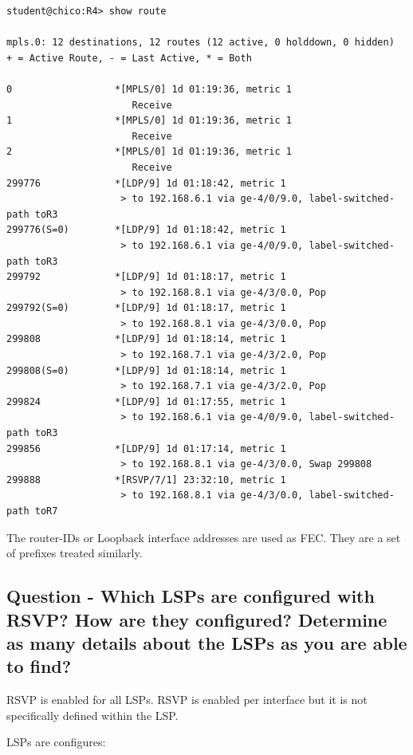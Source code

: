 \documentclass[a4paper]{article}
\begin{document}
\begin{verbatim}
student@chico:R4> show route 

mpls.0: 12 destinations, 12 routes (12 active, 0 holddown, 0 hidden)
+ = Active Route, - = Last Active, * = Both

0                  *[MPLS/0] 1d 01:19:36, metric 1
                      Receive
1                  *[MPLS/0] 1d 01:19:36, metric 1
                      Receive
2                  *[MPLS/0] 1d 01:19:36, metric 1
                      Receive
299776             *[LDP/9] 1d 01:18:42, metric 1
                    > to 192.168.6.1 via ge-4/0/9.0, label-switched-path toR3
299776(S=0)        *[LDP/9] 1d 01:18:42, metric 1
                    > to 192.168.6.1 via ge-4/0/9.0, label-switched-path toR3
299792             *[LDP/9] 1d 01:18:17, metric 1
                    > to 192.168.8.1 via ge-4/3/0.0, Pop      
299792(S=0)        *[LDP/9] 1d 01:18:17, metric 1
                    > to 192.168.8.1 via ge-4/3/0.0, Pop      
299808             *[LDP/9] 1d 01:18:14, metric 1
                    > to 192.168.7.1 via ge-4/3/2.0, Pop      
299808(S=0)        *[LDP/9] 1d 01:18:14, metric 1
                    > to 192.168.7.1 via ge-4/3/2.0, Pop      
299824             *[LDP/9] 1d 01:17:55, metric 1
                    > to 192.168.6.1 via ge-4/0/9.0, label-switched-path toR3
299856             *[LDP/9] 1d 01:17:14, metric 1
                    > to 192.168.8.1 via ge-4/3/0.0, Swap 299808
299888             *[RSVP/7/1] 23:32:10, metric 1
                    > to 192.168.8.1 via ge-4/3/0.0, label-switched-path toR7

\end{verbatim}

The router-IDs or Loopback interface addresses are used as FEC. They are a set of prefixes treated similarly. 


\subsection{Question - Which LSPs are configured with RSVP? How are they configured? Determine as many details about the LSPs as you are able to find?}

RSVP is enabled for all LSPs. RSVP  is enabled per interface but it is not specifically defined within the LSP.

LSPs are configures:
\end{document}
